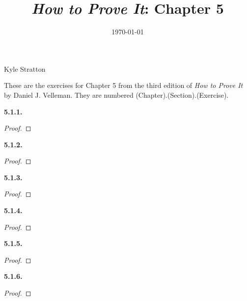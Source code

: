 \documentclass[12pt]{amsart}
\title{\emph{How to Prove It}: Chapter 5} %
\date{\today}
\newenvironment{statement}[1]{\smallskip\noindent\color[rgb]{.6627, .3529, .6314} {\bf #1.}}{}
\theoremstyle{definition}
\theoremstyle{remark}
\begin{document}
\maketitle

\vspace*{-0.25in}
\centerline{Kyle Stratton}

\begin{framed}
These are the exercises for Chapter 5 from the third edition of \emph{How to Prove It} by Daniel J. Velleman.
They are numbered (Chapter).(Section).(Exercise).
\end{framed}

\begin{statement}{5.1.1}
\end{statement}

\begin{proof}
\end{proof}


\begin{statement}{5.1.2}
\end{statement}

\begin{proof}
\end{proof}


\begin{statement}{5.1.3}
\end{statement}

\begin{proof}
\end{proof}


\begin{statement}{5.1.4}
\end{statement}

\begin{proof}
\end{proof}


\begin{statement}{5.1.5}
\end{statement}

\begin{proof}
\end{proof}


\begin{statement}{5.1.6}
\end{statement}

\begin{proof}
\end{proof}
\end{document}
